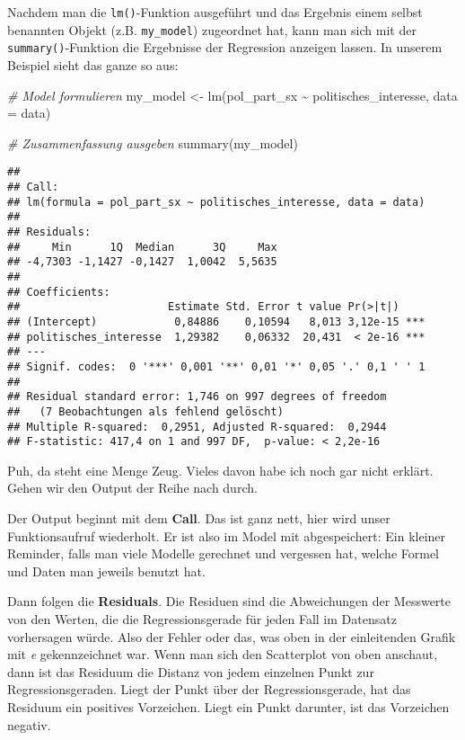 \documentclass[
]{book}
\newenvironment{Shaded}{\begin{snugshade}}{\end{snugshade}}
\newcommand{\AttributeTok}[1]{\textcolor[rgb]{0.77,0.63,0.00}{#1}}
\newcommand{\CommentTok}[1]{\textcolor[rgb]{0.56,0.35,0.01}{\textit{#1}}}
\newcommand{\FunctionTok}[1]{\textcolor[rgb]{0.00,0.00,0.00}{#1}}
\newcommand{\NormalTok}[1]{#1}
\newcommand{\OtherTok}[1]{\textcolor[rgb]{0.56,0.35,0.01}{#1}}
\newcommand{\SpecialCharTok}[1]{\textcolor[rgb]{0.00,0.00,0.00}{#1}}
\begin{document}
Nachdem man die \texttt{lm()}-Funktion ausgeführt und das Ergebnis einem selbst benannten Objekt (z.B. \texttt{my\_model}) zugeordnet hat, kann man sich mit der \texttt{summary()}-Funktion die Ergebnisse der Regression anzeigen lassen. In unserem Beispiel sieht das ganze so aus:

\begin{Shaded}
\begin{Highlighting}[]
\CommentTok{\# Model formulieren}
\NormalTok{my\_model }\OtherTok{\textless{}{-}} \FunctionTok{lm}\NormalTok{(pol\_part\_sx }\SpecialCharTok{\textasciitilde{}}\NormalTok{ politisches\_interesse, }\AttributeTok{data =}\NormalTok{ data)}
  
\CommentTok{\# Zusammenfassung ausgeben}
\FunctionTok{summary}\NormalTok{(my\_model)}
\end{Highlighting}
\end{Shaded}

\begin{verbatim}
## 
## Call:
## lm(formula = pol_part_sx ~ politisches_interesse, data = data)
## 
## Residuals:
##     Min      1Q  Median      3Q     Max 
## -4,7303 -1,1427 -0,1427  1,0042  5,5635 
## 
## Coefficients:
##                       Estimate Std. Error t value Pr(>|t|)    
## (Intercept)            0,84886    0,10594   8,013 3,12e-15 ***
## politisches_interesse  1,29382    0,06332  20,431  < 2e-16 ***
## ---
## Signif. codes:  0 '***' 0,001 '**' 0,01 '*' 0,05 '.' 0,1 ' ' 1
## 
## Residual standard error: 1,746 on 997 degrees of freedom
##   (7 Beobachtungen als fehlend gelöscht)
## Multiple R-squared:  0,2951, Adjusted R-squared:  0,2944 
## F-statistic: 417,4 on 1 and 997 DF,  p-value: < 2,2e-16
\end{verbatim}

Puh, da steht eine Menge Zeug. Vieles davon habe ich noch gar nicht erklärt. Gehen wir den Output der Reihe nach durch.

Der Output beginnt mit dem \textbf{Call}. Das ist ganz nett, hier wird unser Funktionsaufruf wiederholt. Er ist also im Model mit abgespeichert: Ein kleiner Reminder, falls man viele Modelle gerechnet und vergessen hat, welche Formel und Daten man jeweils benutzt hat.

Dann folgen die \textbf{Residuals}. Die Residuen sind die Abweichungen der Messwerte von den Werten, die die Regressionsgerade für jeden Fall im Datensatz vorhersagen würde. Also der Fehler oder das, was oben in der einleitenden Grafik mit \emph{e} gekennzeichnet war. Wenn man sich den Scatterplot von oben anschaut, dann ist das Residuum die Distanz von jedem einzelnen Punkt zur Regressionsgeraden. Liegt der Punkt über der Regressionsgerade, hat das Residuum ein positives Vorzeichen. Liegt ein Punkt darunter, ist das Vorzeichen negativ.
\end{document}
